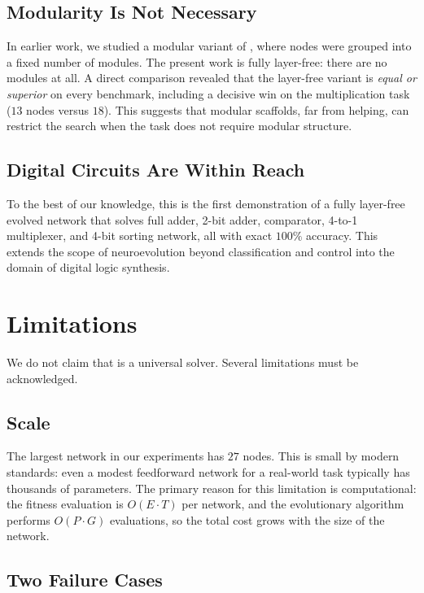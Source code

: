 \subsection{Modularity Is Not Necessary}

In earlier work, we studied a modular variant of \modnet{}, where
nodes were grouped into a fixed number of modules. The present work is
fully layer-free: there are no modules at all. A direct comparison
revealed that the layer-free variant is \emph{equal or superior} on
every benchmark, including a decisive win on the multiplication task
($13$ nodes versus $18$). This suggests that modular scaffolds, far
from helping, can restrict the search when the task does not require
modular structure.

\subsection{Digital Circuits Are Within Reach}

To the best of our knowledge, this is the first demonstration of a
fully layer-free evolved network that solves full adder, 2-bit adder,
comparator, 4-to-1 multiplexer, and 4-bit sorting network, all with
exact $100\%$ accuracy. This extends the scope of neuroevolution
beyond classification and control into the domain of digital logic
synthesis.

\section{Limitations}

We do not claim that \modnet{} is a universal solver. Several
limitations must be acknowledged.

\subsection{Scale}

The largest network in our experiments has $27$ nodes. This is small
by modern standards: even a modest feedforward network for a real-world
task typically has thousands of parameters. The primary reason for
this limitation is computational: the fitness evaluation is
$O(E \cdot T)$ per network, and the evolutionary algorithm performs
$O(P \cdot G)$ evaluations, so the total cost grows with the size of
the network.

\subsection{Two Failure Cases}

